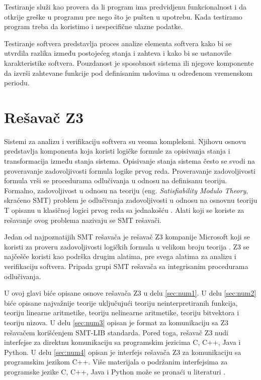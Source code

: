 \documentclass[12pt,oneside]{memoir}
\begin{document}
Testiranje služi kao provera da li program ima predvidjenu funkcionalnost i da 
otkrije greške u programu pre nego što je pušten u upotrebu. Kada testiramo
program treba da koristimo i nespecifične ulazne podatke.

Testiranje softvera predstavlja proces analize elementa softvera kako bi se
utvrdila razlika između postojećeg stanja i zahteva i kako bi se ustanovile
karakteristike softvera. Pouzdanost je sposobnost sistema ili njegove komponente
da izvrši zahtevane funkcije pod definisanim uslovima u određenom vremenskom
periodu.

\chapter{Rešavač Z3}
\label{chp:razrada}

Sistemi za analizu i verifikaciju softvera su veoma kompleksni. Njihovu osnovu predstavlja komponenta koja koristi logičke formule za opisivanja stanja i transformacija između stanja sistema. Opisivanje stanja sistema često se svodi na proveravanje zadovoljivosti formula logike prvog reda. 
Proveravanje zadovoljivosti formula vrši se procedurama odlučivanja u odnosu na definisanu teoriju. Formalno, zadovoljivost u odnosu na teoriju (eng. \textit{Satisfiability Modulo Theory}, skraćeno SMT) problem je odlučivanja zadovoljivosti u odnosu na osnovnu teoriju T opisanu u klasičnoj logici prvog reda sa jednakošću \cite{Barrett}. Alati koji se koriste za rešavanje ovog problema nazivaju se SMT rešavači. 
\par

Jedan od najpoznatijih SMT rešavača je rešavač Z3 kompanije Microsoft koji se koristi za proveru zadovoljivosti logičkih formula u velikom broju teorija \cite{EfficientSMTSolver}. Z3 se najčešče koristi kao podrška drugim alatima, pre svega alatima za analizu i verifikaciju softvera. Pripada grupi SMT rešavača sa integrisanim procedurama odlučivanja.
\par
U ovoj glavi biće opisane osnove rešavača Z3 u delu \ref{sec:num1}. U delu \ref{sec:num2} biće opisane najvažnije teorije uključujući teoriju neinterpretiranih funkcija, teoriju linearne aritmetike, teoriju nelinearne aritmetike, teoriju bitvektora i teoriju nizova. 
U delu \ref{sec:num3} opisan je format za komunikaciju sa Z3 rešavačem korišćenjem SMT-LIB standarda. Pored toga, rešavač Z3 nudi interfejse za direktnu komunikaciju sa programskim jezicima C, C++, Java i Python. U delu \ref{sec:num4} opisan je interfejs rešavača Z3 za komunikaciju sa programskim jezikom C++. Više materijala o podržanim interfejsima za programske jezike C, C++, Java i Python može se pronaći u literaturi \cite{api}.
\end{document}
